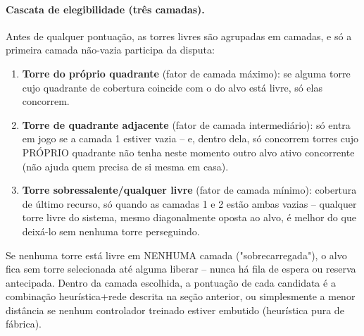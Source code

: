 \documentclass[12pt,a4paper]{article}
\begin{document}
\paragraph{Cascata de elegibilidade (três camadas).} Antes de qualquer pontuação, as torres livres
são agrupadas em camadas, e só a primeira camada não-vazia participa da disputa:
\begin{enumerate}
  \item \textbf{Torre do próprio quadrante} (fator de camada máximo): se alguma torre cujo
  quadrante de cobertura coincide com o do alvo está livre, só elas concorrem.
  \item \textbf{Torre de quadrante adjacente} (fator de camada intermediário): só entra em jogo se a
  camada 1 estiver vazia -- e, dentro dela, só concorrem torres cujo PRÓPRIO quadrante não tenha
  neste momento outro alvo ativo concorrente (não ajuda quem precisa de si mesma em casa).
  \item \textbf{Torre sobressalente/qualquer livre} (fator de camada mínimo): cobertura de
  último recurso, só quando as camadas 1 e 2 estão ambas vazias -- qualquer torre livre do sistema,
  mesmo diagonalmente oposta ao alvo, é melhor do que deixá-lo sem nenhuma torre perseguindo.
\end{enumerate}
Se nenhuma torre está livre em NENHUMA camada ("sobrecarregada"), o alvo fica sem torre selecionada
até alguma liberar -- nunca há fila de espera ou reserva antecipada. Dentro da camada escolhida, a
pontuação de cada candidata é a combinação heurística+rede descrita na seção anterior, ou
simplesmente a menor distância se nenhum controlador treinado estiver embutido (heurística pura de
fábrica).
\end{document}
